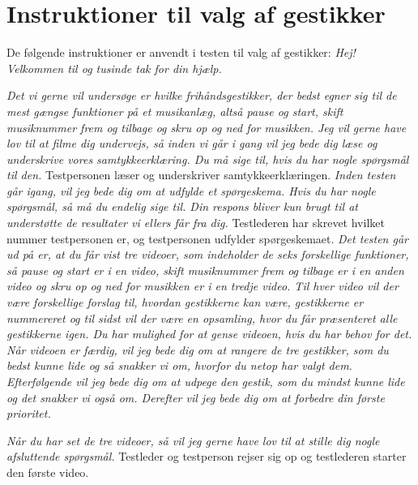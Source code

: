 \chapter{Instruktioner til valg af gestikker}
\label{app:InstruktionerValgAfGestikker}
%
De følgende instruktioner er anvendt i testen til valg af gestikker:\blankline
%
\textit{Hej! Velkommen til og tusinde tak for din hjælp.} 

\textit{Det vi gerne vil undersøge er hvilke frihåndsgestikker, der bedst egner sig til de mest gængse funktioner på et musikanlæg, altså pause og start, skift musiknummer frem og tilbage og skru op og ned for musikken. Jeg vil gerne have lov til at filme dig undervejs, så inden vi går i gang vil jeg bede dig læse og underskrive vores samtykkeerklæring. Du må sige til, hvis du har nogle spørgsmål til den.}\blankline
%
Testpersonen læser og underskriver samtykkeerklæringen. \blankline
%  
\textit{Inden testen går igang, vil jeg bede dig om at udfylde et spørgeskema. Hvis du har nogle spørgsmål, så må du endelig sige til. Din respons bliver kun brugt til at understøtte de resultater vi ellers får fra dig.} \blankline
%
Testlederen har skrevet hvilket nummer testpersonen er, og testpersonen udfylder spørgeskemaet.\blankline
%  
\textit{Det testen går ud på er, at du får vist tre videoer, som indeholder de seks forskellige funktioner, så pause og start er i en video, skift musiknummer frem og tilbage er i en anden video og skru op og ned for musikken er i en tredje video. Til hver video vil der være forskellige forslag til, hvordan gestikkerne kan være, gestikkerne er nummereret og til sidst vil der være en opsamling, hvor du får præsenteret alle gestikkerne igen. Du har mulighed for at gense videoen, hvis du har behov for det. Når videoen er færdig, vil jeg bede dig om at rangere de tre gestikker, som du bedst kunne lide og så snakker vi om, hvorfor du netop har valgt dem. Efterfølgende vil jeg bede dig om at udpege den gestik, som du mindst kunne lide og det snakker vi også om. Derefter vil jeg bede dig om at forbedre din første prioritet.} 

\textit{Når du har set de tre videoer, så vil jeg gerne have lov til at stille dig nogle afsluttende spørgsmål.}\blankline
%
Testleder og testperson rejser sig op og testlederen starter den første video. 
% 
